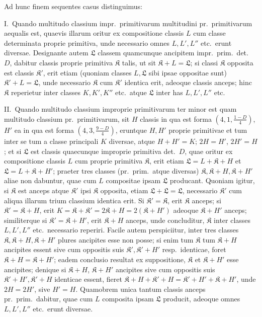 \documentclass[12pt,a4paper]{article}
\theoremstyle{plain}
\theoremstyle{definition}
\theoremstyle{remark}
\begin{document}
Ad hunc finem sequentes casus distinguimus:

I.\ Quando multitudo classium impr.\ primitivarum multitudini pr.\ primitivarum aequalis est, quaevis illarum oritur ex compositione classis $L$ cum classe determinata proprie primitiva, unde necessario omnes $L, L', L''$ etc.\ erunt diversae. Designante autem $\mathfrak{L}$ classem quamcunque ancipitem impr.\ prim.\ det.\ $D$, dabitur classis proprie primitiva $\mathfrak{K}$ talis, ut sit $\mathfrak{K} + L = \mathfrak{L}$; si classi $\mathfrak{K}$ opposita est classis $\mathfrak{K}'$, erit etiam (quoniam classes $L, \mathfrak{L}$ sibi ipsae oppositae sunt) $\mathfrak{K}' + L = \mathfrak{L}$, unde necessario $\mathfrak{K}$ cum $\mathfrak{K}'$ identica erit, adeoque classis anceps; hinc $\mathfrak{K}$ reperietur inter classes $K, K', K''$ etc.\ atque $\mathfrak{L}$ inter has $L, L', L''$ etc.

II.\ Quando multitudo classium improprie primitivarum ter minor est quam multitudo classium pr.\ primitivarum, sit $H$ classis in qua est forma $(4, 1, \tfrac{1-D}{4})$, $H'$ ea in qua est forma $(4, 3, \tfrac{9-D}{4})$, eruntque $H, H'$ proprie primitivae et tum inter se tum a classe principali $K$ diversae, atque $H + H' = K$; $2H = H'$, $2H' = H$; et si $\mathfrak{L}$ est classis quaecunque improprie primitiva det.\ $D$, quae oritur ex compositione classis $L$ cum proprie primitiva $\mathfrak{K}$, erit etiam $\mathfrak{L} = L + \mathfrak{K} + H$ et $\mathfrak{L} = L + \mathfrak{K} + H'$; praeter tres classes (pr.\ prim.\ atque diversas) $\mathfrak{K}, \mathfrak{K} + H, \mathfrak{K} + H'$ aliae non dabuntur, quae cum $L$ compositae ipsam $\mathfrak{L}$ producant. Quoniam igitur, si $\mathfrak{K}$ est anceps atque $\mathfrak{K}'$ ipsi $\mathfrak{K}$ opposita, etiam $\mathfrak{L} + \mathfrak{L} = \mathfrak{L}$, necessario $\mathfrak{K}'$ cum aliqua illarum trium classium identica erit. Si $\mathfrak{K}' = \mathfrak{K}$, erit $\mathfrak{K}$ anceps; si $\mathfrak{K}' = \mathfrak{K} + H$, erit $K = \mathfrak{K} + \mathfrak{K}' = 2\mathfrak{K} + H = 2(\mathfrak{K} + H')$ adeoque $\mathfrak{K} + H'$ anceps; similiterque si $\mathfrak{K}' = \mathfrak{K} + H'$, erit $\mathfrak{K} + H$ anceps, unde concluditur, $\mathfrak{K}$ inter classes $L, L', L''$ etc.\ necessario reperiri. Facile autem perspiciitur, inter tres classes $\mathfrak{K}, \mathfrak{K} + H, \mathfrak{K} + H'$ plures ancipites esse non posse; si enim tum $\mathfrak{K}$ tum $\mathfrak{K} + H$ ancipites essent sive cum oppositis suis $\mathfrak{K}', \mathfrak{K}' + H'$ resp.\ identicae, foret $\mathfrak{K} + H = \mathfrak{K} + H'$; eadem conclusio resultat ex suppositione, $\mathfrak{K}$ et $\mathfrak{K} + H'$ esse ancipites; denique si $\mathfrak{K} + H$, $\mathfrak{K} + H'$ ancipites sive cum oppositis suis $\mathfrak{K}' + H', \mathfrak{K}' + H$ identicae essent, fieret $\mathfrak{K} + H + \mathfrak{K}' + H = \mathfrak{K}' + H' + \mathfrak{K} + H'$, unde $2H = 2H'$, sive $H' = H$. Quamobrem unica tantum classis anceps pr.\ prim.\ dabitur, quae cum $L$ composita ipsam $\mathfrak{L}$ producit, adeoque omnes $L, L', L''$ etc.\ erunt diversae.
\end{document}
